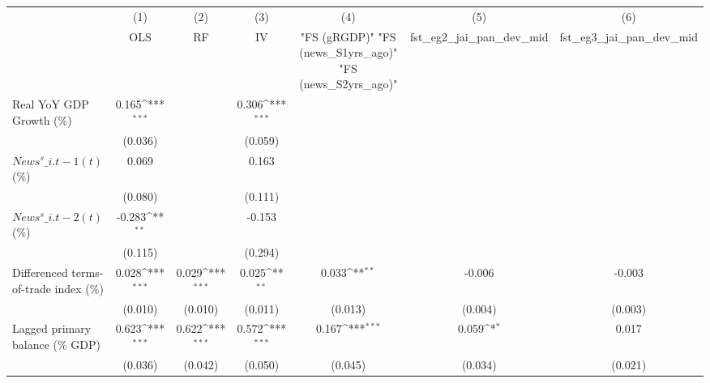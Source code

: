 {
\def\sym#1{\ifmmode^{#1}\else\(^{#1}\)\fi}
\begin{tabular}{l*{6}{c}}
\toprule
                    &\multicolumn{1}{c}{(1)}&\multicolumn{1}{c}{(2)}&\multicolumn{1}{c}{(3)}&\multicolumn{1}{c}{(4)}&\multicolumn{1}{c}{(5)}&\multicolumn{1}{c}{(6)}\\
                    &\multicolumn{1}{c}{OLS}&\multicolumn{1}{c}{RF}&\multicolumn{1}{c}{IV}&\multicolumn{1}{c}{ "FS (gRGDP)"  "FS (news\_S1yrs\_ago)"  "FS (news\_S2yrs\_ago)" }&\multicolumn{1}{c}{fst\_eg2\_jai\_pan\_dev\_mid}&\multicolumn{1}{c}{fst\_eg3\_jai\_pan\_dev\_mid}\\
\midrule
Real YoY GDP Growth (\%)&       0.165\sym{***}&                     &       0.306\sym{***}&                     &                     &                     \\
                    &     (0.036)         &                     &     (0.059)         &                     &                     &                     \\
\addlinespace
$ News^s\_{i.t-1}(t)$ (\%)&       0.069         &                     &       0.163         &                     &                     &                     \\
                    &     (0.080)         &                     &     (0.111)         &                     &                     &                     \\
\addlinespace
$ News^s\_{i.t-2}(t)$ (\%)&      -0.283\sym{**} &                     &      -0.153         &                     &                     &                     \\
                    &     (0.115)         &                     &     (0.294)         &                     &                     &                     \\
\addlinespace
Differenced terms-of-trade index (\%)&       0.028\sym{***}&       0.029\sym{***}&       0.025\sym{**} &       0.033\sym{**} &      -0.006         &      -0.003         \\
                    &     (0.010)         &     (0.010)         &     (0.011)         &     (0.013)         &     (0.004)         &     (0.003)         \\
\addlinespace
Lagged primary balance (\% GDP)&       0.623\sym{***}&       0.622\sym{***}&       0.572\sym{***}&       0.167\sym{***}&       0.059\sym{*}  &       0.017         \\
                    &     (0.036)         &     (0.042)         &     (0.050)         &     (0.045)         &     (0.034)         &     (0.021)         \\

\end{tabular}}

